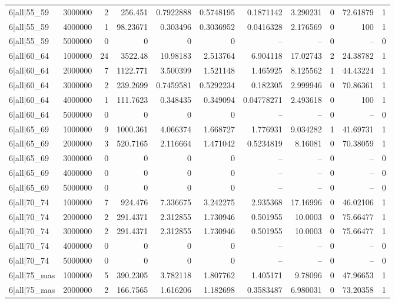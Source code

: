 \begin{tabular}{lrrrrrrrrrr}
6|all|55\_59 & 3000000 & 2 & 256.451 & 0.7922888 & 0.5748195 & 0.1871142 & 3.290231 & 0 & 72.61879 & 1 \\
6|all|55\_59 & 4000000 & 1 & 98.23671 & 0.303496 & 0.3036952 & 0.0416328 & 2.176569 & 0 & 100 & 1 \\
6|all|55\_59 & 5000000 & 0 & 0 & 0 & 0 & -- & -- & 0 & -- & 0 \\
6|all|60\_64 & 1000000 & 24 & 3522.48 & 10.98183 & 2.513764 & 6.904118 & 17.02743 & 2 & 24.38782 & 1 \\
6|all|60\_64 & 2000000 & 7 & 1122.771 & 3.500399 & 1.521148 & 1.465925 & 8.125562 & 1 & 44.43224 & 1 \\
6|all|60\_64 & 3000000 & 2 & 239.2699 & 0.7459581 & 0.5292234 & 0.182305 & 2.999946 & 0 & 70.86361 & 1 \\
6|all|60\_64 & 4000000 & 1 & 111.7623 & 0.348435 & 0.349094 & 0.04778271 & 2.493618 & 0 & 100 & 1 \\
6|all|60\_64 & 5000000 & 0 & 0 & 0 & 0 & -- & -- & 0 & -- & 0 \\
6|all|65\_69 & 1000000 & 9 & 1000.361 & 4.066374 & 1.668727 & 1.776931 & 9.034282 & 1 & 41.69731 & 1 \\
6|all|65\_69 & 2000000 & 3 & 520.7165 & 2.116664 & 1.471042 & 0.5234819 & 8.16081 & 0 & 70.38059 & 1 \\
6|all|65\_69 & 3000000 & 0 & 0 & 0 & 0 & -- & -- & 0 & -- & 0 \\
6|all|65\_69 & 4000000 & 0 & 0 & 0 & 0 & -- & -- & 0 & -- & 0 \\
6|all|65\_69 & 5000000 & 0 & 0 & 0 & 0 & -- & -- & 0 & -- & 0 \\
6|all|70\_74 & 1000000 & 7 & 924.476 & 7.336675 & 3.242275 & 2.935368 & 17.16996 & 0 & 46.02106 & 1 \\
6|all|70\_74 & 2000000 & 2 & 291.4371 & 2.312855 & 1.730946 & 0.501955 & 10.0003 & 0 & 75.66477 & 1 \\
6|all|70\_74 & 3000000 & 2 & 291.4371 & 2.312855 & 1.730946 & 0.501955 & 10.0003 & 0 & 75.66477 & 1 \\
6|all|70\_74 & 4000000 & 0 & 0 & 0 & 0 & -- & -- & 0 & -- & 0 \\
6|all|70\_74 & 5000000 & 0 & 0 & 0 & 0 & -- & -- & 0 & -- & 0 \\
6|all|75\_mas & 1000000 & 5 & 390.2305 & 3.782118 & 1.807762 & 1.405171 & 9.78096 & 0 & 47.96653 & 1 \\
6|all|75\_mas & 2000000 & 2 & 166.7565 & 1.616206 & 1.182698 & 0.3583487 & 6.980031 & 0 & 73.20358 & 1 \\

\end{tabular}
